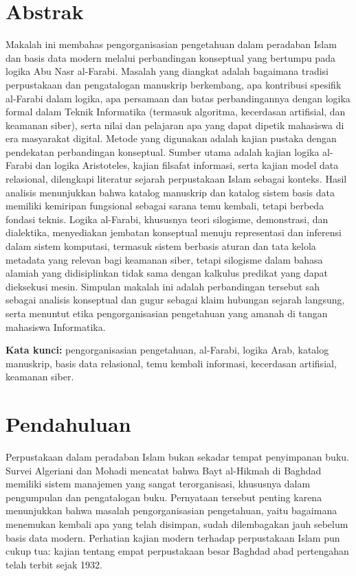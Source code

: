 \documentclass[12pt,a4paper]{article}
\begin{document}
\section*{Abstrak}
Makalah ini membahas pengorganisasian pengetahuan dalam peradaban Islam dan basis data modern melalui perbandingan konseptual yang bertumpu pada logika Abu Nasr al-Farabi. Masalah yang diangkat adalah bagaimana tradisi perpustakaan dan pengatalogan manuskrip berkembang, apa kontribusi spesifik al-Farabi dalam logika, apa persamaan dan batas perbandingannya dengan logika formal dalam Teknik Informatika (termasuk algoritma, kecerdasan artifisial, dan keamanan siber), serta nilai dan pelajaran apa yang dapat dipetik mahasiswa di era masyarakat digital. Metode yang digunakan adalah kajian pustaka dengan pendekatan perbandingan konseptual. Sumber utama adalah kajian logika al-Farabi dan logika Aristoteles, kajian filsafat informasi, serta kajian model data relasional, dilengkapi literatur sejarah perpustakaan Islam sebagai konteks. Hasil analisis menunjukkan bahwa katalog manuskrip dan katalog sistem basis data memiliki kemiripan fungsional sebagai sarana temu kembali, tetapi berbeda fondasi teknis. Logika al-Farabi, khususnya teori silogisme, demonstrasi, dan dialektika, menyediakan jembatan konseptual menuju representasi dan inferensi dalam sistem komputasi, termasuk sistem berbasis aturan dan tata kelola metadata yang relevan bagi keamanan siber, tetapi silogisme dalam bahasa alamiah yang didisiplinkan tidak sama dengan kalkulus predikat yang dapat dieksekusi mesin. Simpulan makalah ini adalah perbandingan tersebut sah sebagai analisis konseptual dan gugur sebagai klaim hubungan sejarah langsung, serta menuntut etika pengorganisasian pengetahuan yang amanah di tangan mahasiswa Informatika.

\noindent\textbf{Kata kunci:} pengorganisasian pengetahuan, al-Farabi, logika Arab, katalog manuskrip, basis data relasional, temu kembali informasi, kecerdasan artifisial, keamanan siber.

\newpage
\tableofcontents
\listoftables
\newpage

\section{Pendahuluan}

Perpustakaan dalam peradaban Islam bukan sekadar tempat penyimpanan buku. Survei Algeriani dan Mohadi mencatat bahwa Bayt al-Hikmah di Baghdad memiliki sistem manajemen yang sangat terorganisasi, khususnya dalam pengumpulan dan pengatalogan buku.\autocite{algeriani-mohadi2017} Pernyataan tersebut penting karena menunjukkan bahwa masalah pengorganisasian pengetahuan, yaitu bagaimana menemukan kembali apa yang telah disimpan, sudah dilembagakan jauh sebelum basis data modern. Perhatian kajian modern terhadap perpustakaan Islam pun cukup tua: kajian tentang empat perpustakaan besar Baghdad abad pertengahan telah terbit sejak 1932.\autocite{mackensen1932}
\end{document}
